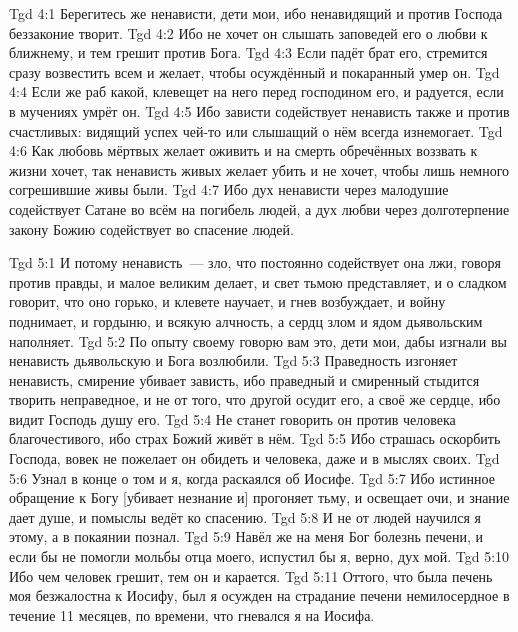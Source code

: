 \vs Tgd 4:1
Берегитесь же ненависти, дети мои,
ибо ненавидящий и против Господа беззаконие творит.
\vs Tgd 4:2
Ибо не хочет он слышать заповедей его о любви к ближнему,
и тем грешит против Бога.
\vs Tgd 4:3
Если падёт брат его,
стремится сразу возвестить всем и желает,
чтобы осуждённый и покаранный умер он.
\vs Tgd 4:4
Если же раб какой, клевещет на него перед господином его,
и радуется, если в мучениях умрёт он.
\vs Tgd 4:5
Ибо зависти содействует ненависть также и против счастливых:
видящий успех чей-то или слышащий о нём всегда изнемогает.
\vs Tgd 4:6
Как любовь мёртвых желает оживить и на смерть обречённых
воззвать к жизни хочет, так ненависть живых желает убить
и не хочет, чтобы лишь немного согрешившие живы были.
\vs Tgd 4:7
Ибо дух ненависти через малодушие содействует Сатане
во всём на погибель людей, а дух любви через
долготерпение закону Божию содействует во спасение людей.

\vs Tgd 5:1
И потому ненависть~--- зло,
что постоянно содействует она лжи, говоря против правды,
и малое великим делает, и свет тьмою представляет,
и о сладком говорит, что оно горько,
и клевете научает, и гнев возбуждает,
и войну поднимает, и гордыню, и всякую алчность,
а сердц злом и ядом дьявольским наполняет.
\vs Tgd 5:2
По опыту своему говорю вам это, дети мои, дабы изгнали вы ненависть
дьявольскую и Бога возлюбили.
\vs Tgd 5:3
Праведность изгоняет ненависть,
смирение убивает зависть,
ибо праведный и смиренный стыдится творить неправедное,
и не от того, что другой осудит его, а своё же сердце,
ибо видит Господь душу его.
\vs Tgd 5:4
Не станет говорить он против человека благочестивого,
ибо страх Божий живёт в нём.
\vs Tgd 5:5
Ибо страшась оскорбить Господа, вовек не пожелает
он обидеть и человека, даже и в мыслях своих.
\vs Tgd 5:6
Узнал в конце о том и я, когда раскаялся об Иосифе.
\vs Tgd 5:7
Ибо истинное обращение к Богу [убивает незнание и]
прогоняет тьму, и освещает очи, и знание дает душе,
и помыслы ведёт ко спасению.
\vs Tgd 5:8
И не от людей научился я этому, а в покаянии познал.
\vs Tgd 5:9
Навёл же на меня Бог болезнь печени,
и если бы не помогли мольбы отца моего,
испустил бы я, верно, дух мой.
\vs Tgd 5:10
Ибо чем человек грешит, тем он и карается.
\vs Tgd 5:11
Оттого, что была печень моя безжалостна к Иосифу,
был я осужден на страдание печени немилосердное
в течение 11 месяцев, по времени, что гневался я на Иосифа.

